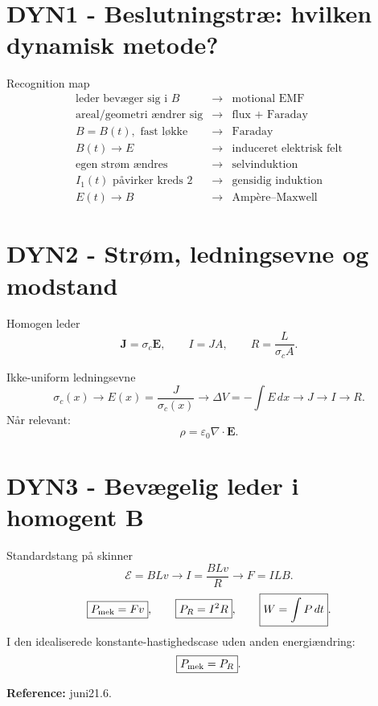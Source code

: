 \documentclass[10pt,a4paper]{article}
\begin{document}
\section*{DYN1 - Beslutningstræ: hvilken dynamisk metode?}
{}
\begin{casebox}{Recognition map}
\[
\begin{array}{rcl}
\text{leder bevæger sig i }B &\to& \text{motional EMF}\\
\text{areal/geometri ændrer sig} &\to& \text{flux + Faraday}\\
B=B(t),\text{ fast løkke} &\to& \text{Faraday}\\
B(t)\to E &\to& \text{induceret elektrisk felt}\\
\text{egen strøm ændres} &\to& \text{selvinduktion}\\
I_1(t)\text{ påvirker kreds 2} &\to& \text{gensidig induktion}\\
E(t)\to B &\to& \text{Ampère--Maxwell}
\end{array}
\]
\end{casebox}

\section*{DYN2 - Strøm, ledningsevne og modstand}
{}
\begin{casebox}{Homogen leder}
\[
\boxed{\mathbf J=\sigma_c\mathbf E},
\qquad
\boxed{I=JA},
\qquad
\boxed{R=\frac{L}{\sigma_cA}}.
\]
\end{casebox}
\begin{casebox}{Ikke-uniform ledningsevne}
\[
\boxed{\sigma_c(x)\to E(x)=\frac{J}{\sigma_c(x)}
\to \Delta V=-\int E\,dx\to J\to I\to R}.
\]
Når relevant:
\[
\boxed{\rho=\varepsilon_0\nabla\cdot\mathbf E}.
\]
\end{casebox}

\newpage
\section*{DYN3 - Bevægelig leder i homogent $\mathbf B$}
{}
\begin{casebox}{Standardstang på skinner}
\[
\boxed{\mathcal E=BLv}
\to
\boxed{I=\frac{BLv}{R}}
\to
\boxed{F=ILB}.
\]
\[
\boxed{P_{\rm mek}=Fv},
\qquad
\boxed{P_R=I^2R},
\qquad
\boxed{W=\int P\,dt}.
\]
I den idealiserede konstante-hastighedscase uden anden energiændring:
\[
\boxed{P_{\rm mek}=P_R}.
\]
\end{casebox}
\textbf{Reference:} juni21.6.
\end{document}
